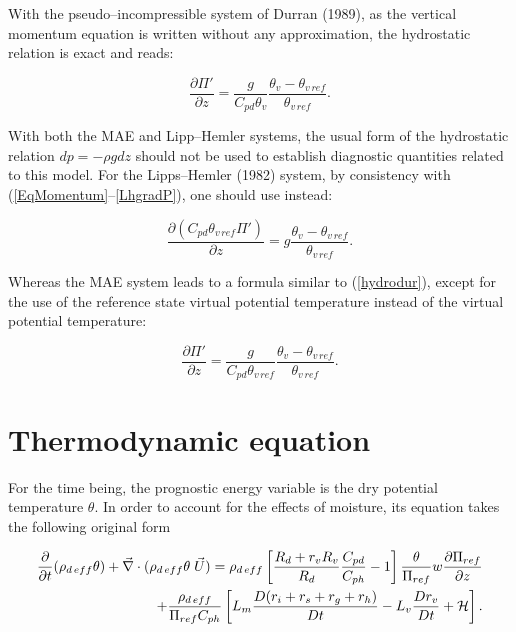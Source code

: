 With the pseudo--incompressible system of Durran (1989), as the vertical momentum equation
is written without any approximation, the hydrostatic relation is exact and reads:

\begin{equation}
\dfrac{\partial \Pi '}{\partial z} = \dfrac{g} {C_{pd} \theta_{v}}
\dfrac{\theta_v-\theta_{v\,ref}} {\theta_{v\,ref}}.
\label{hydrodur}
\end{equation}

With both the MAE and Lipp--Hemler systems, the usual form of the hydrostatic
relation $dp=-\rho g dz$ should not be used to establish diagnostic quantities
related to this model. For the Lipps--Hemler (1982) system, by consistency with
(\ref{EqMomentum}--\ref{LhgradP}), one should use instead:

\begin{equation}
\dfrac{\partial (C_{pd} \theta_{v\,ref} \Pi ')}{\partial z} = g \dfrac{\theta_v-\theta_{v\,ref}}
{\theta_{v\,ref}}.
\end{equation}

Whereas the MAE system leads to a formula similar to (\ref{hydrodur}), except for the use
of the reference state virtual potential temperature instead of the virtual potential
temperature:

\begin{equation}
\dfrac{\partial \Pi '}{\partial z} = \dfrac{g} {C_{pd} \theta_{v\,ref}}
\dfrac{\theta_v-\theta_{v\,ref}} {\theta_{v\,ref}}.
\end{equation}

\section{Thermodynamic equation}
For the time being, the prognostic energy variable is the dry potential
temperature $\theta$. In order to account for the effects of moisture, its
equation takes the following original form

\begin{eqnarray}
\dfrac{\partial}{\partial t}(\rho_{d\,eff} \theta)  + \vec{ \nabla} \cdot
(\rho_{d\,eff} \theta \;\vec{U})
= \rho_{d\,eff} \left[ {R_d+r_vR_v\over R_d}{C_{pd} \over C_{ph}}-1 \right]
{\theta \over \Pi_{ref}} w {\partial \Pi_{ref} \over \partial z}
\nonumber \\
+ {\rho_{d\,eff}\over \Pi_{ref} C_{ph}} \left[
 L_m {D(r_i+r_s+r_g+r_h)\over Dt} - L_v {Dr_v\over Dt} + {\cal H}  \right].
\end{eqnarray}


